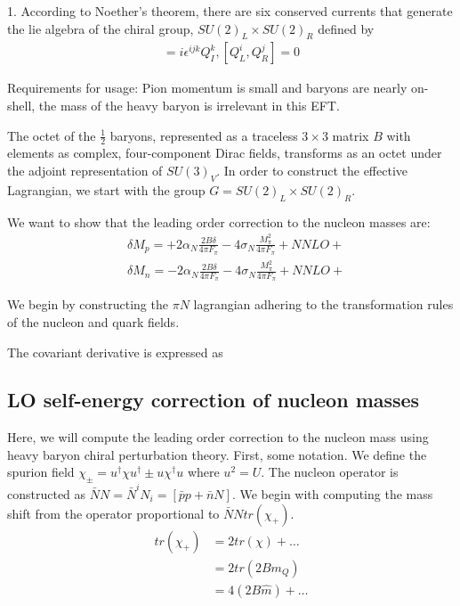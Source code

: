 \documentclass[12pt,tightenlines, raggedbottom, prd, notitlepage]{revtex4-1}
\begin{document}
1. According to Noether's theorem, there are six conserved currents that generate the lie algebra of the chiral group,
$ SU(2)_L \times SU(2)_R$ defined by 
\begin{gather*}
  [Q_I^i, Q_I^j] = i\epsilon^{ijk}Q_I^k , [Q_L^i, Q_R^j] = 0 
\end{gather*}


Requirements for usage: Pion momentum is small and baryons are nearly on-shell, the mass of the heavy baryon is irrelevant
in this EFT. 

The octet of the $\frac{1}{2}$ baryons, represented as a traceless $3 \times 3$ matrix $B$ with elements as
complex, four-component Dirac fields, transforms as an octet under the adjoint representation of 
$SU(3)_V$. In order to construct the effective Lagrangian, we start with the group $G = SU(2)_L \times SU(2)_R$.

We want to show that the leading order correction to the nucleon masses are:
\begin{align*}
 &\delta M_p =  +2\alpha_N \frac{2B\delta}{4\pi F_\pi} - 4\sigma_N \frac{M^2_\pi}{4\pi F_\pi} + NNLO+ \\
 &\delta M_n = -2\alpha_N \frac{2B\delta}{4\pi F_\pi} - 4\sigma_N \frac{M^2_\pi}{4\pi F_\pi} + NNLO+
\end{align*}

We begin by constructing the $\pi N$ lagrangian adhering to the transformation rules
of the nucleon and quark fields. 

The covariant derivative is expressed as 




\subsection*{LO self-energy correction of nucleon masses}

Here, we will compute the leading order correction to the nucleon mass using heavy baryon chiral perturbation theory. First, some notation. We define the spurion field $\chi_{\pm} = u^{\dagger}\chi u^{\dagger} \pm u\chi^{\dagger}u$ where $u^2 = U$.
The nucleon operator is constructed as $\bar{N}N = \bar{N}^iN_i = [\bar{p}p + \bar{n}N]$. We begin with computing the mass shift from the 
operator proportional to $\bar{N}Ntr(\chi_+)$. 
\begin{align*}
tr(\chi_+) &= 2tr(\chi) + \dots \\
&= 2tr(2Bm_Q) \\
&= 4(2B\hat{m}) + \dots
\end{align*}
\end{document}

